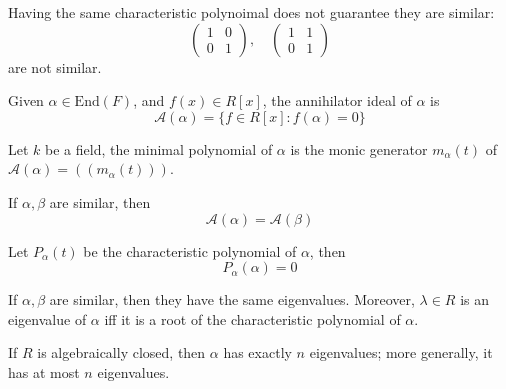\documentclass[openany]{book}
\begin{document}
\begin{example}
    Having the same characteristic polynoimal does not guarantee they are similar:
    \begin{equation*}
        \begin{pmatrix}
            1&0\\
            0&1
        \end{pmatrix}, \quad 
        \begin{pmatrix}
            1&1\\
            0&1
        \end{pmatrix}
    \end{equation*}
    are not similar.
\end{example}


\begin{defn}
    Given $\alpha\in\text{End}(F)$, and $f(x)\in R[x]$, the annihilator ideal of $\alpha$ is 
    \begin{equation*}
        \mathcal{A}(\alpha)=\{f\in R[x]: f(\alpha)=0\}
    \end{equation*}
\end{defn}

\begin{defn}
    Let $k$ be a field, the minimal polynomial of $\alpha$ is the monic generator $m_\alpha(t)$ of $\mathcal{A}(\alpha)=((m_\alpha(t)))$. 
\end{defn}

\begin{prop}
    If $\alpha,\beta$ are similar, then 
    \begin{equation*}
        \mathcal{A}(\alpha)=\mathcal{A}(\beta)
    \end{equation*}
\end{prop}

\begin{prop}
    Let $P_\alpha(t)$ be the characteristic polynomial of $\alpha$, then 
    \begin{equation*}
        P_\alpha(\alpha)=0
    \end{equation*}
\end{prop}

\begin{prop}
    If $\alpha,\beta$ are similar, then they have the same eigenvalues. Moreover, $\lambda\in R$ is an eigenvalue of $\alpha$ iff it is a root of the characteristic polynomial of $\alpha$.
\end{prop}

\begin{prop}
    If $R$ is algebraically closed, then $\alpha$ has exactly $n$ eigenvalues; more generally, it has at most $n$ eigenvalues.
\end{prop}
\end{document}
